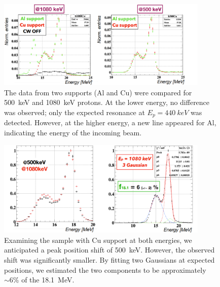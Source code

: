 \begin{refsection}
    \begin{figure}
        \centering
        \includegraphics[width = 0.9\textwidth]{Figures/X17/Dec2023/X172023_Al_Cu.png}
        \caption{The data from two supports (Al and Cu) were compared for \SI{500}{keV} and \SI{1080}{keV} protons. At the lower energy, no difference was observed; only the expected resonance at $E_p=\SI{440}{keV}$ was detected. However, at the higher energy, a new line appeared for Al, indicating the energy of the incoming beam.}
        \label{fig:X17:2023:AlCu}
    \end{figure}


    \begin{figure}
        \centering
        \includegraphics[width = 0.9\textwidth]{Figures/X17/Dec2023/X172023_energy_shift.png}
        \caption{Examining the sample with Cu support at both energies, we anticipated a peak position shift of \SI{500}{keV}. However, the observed shift was significantly smaller. By fitting two Gaussians at expected positions, we estimated the two components to be approximately $\sim6\%$ of the \SI{18.1}{MeV}.
}
        \label{fig:X17:2023:Cu:shift}
    \end{figure}


\end{refsection}
